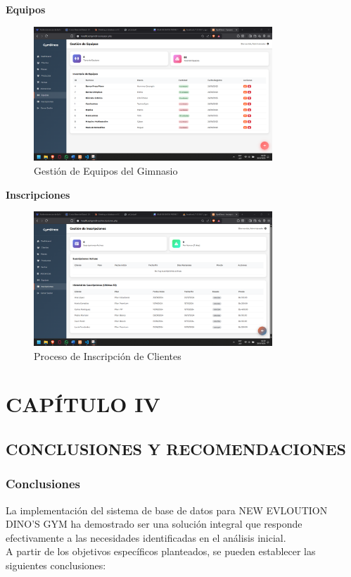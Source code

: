 \documentclass[12pt, letterpaper]{article}
\begin{document}
\textbf{Equipos}
\begin{figure}[ht]
\centering
\includegraphics[width=0.8\textwidth]{equipos.png}
\caption{Gestión de Equipos del Gimnasio}
\label{fig:equipos}
\end{figure}
\newpage

\textbf{Inscripciones}
\begin{figure}[ht]
\centering
\includegraphics[width=0.8\textwidth]{inscripciones.png}
\caption{Proceso de Inscripción de Clientes}
\label{fig:inscripciones}
\end{figure}
\newpage

\section*{CAPÍTULO IV}
\setcounter{section}{4}
\subsection{CONCLUSIONES Y RECOMENDACIONES}
\subsubsection{Conclusiones}
La implementación del sistema de base de datos para NEW EVLOUTION DINO'S GYM ha demostrado ser una solución integral que responde efectivamente a las necesidades identificadas en el análisis inicial.\\ 
A partir de los objetivos específicos planteados, se pueden establecer las siguientes conclusiones:
\end{document}
